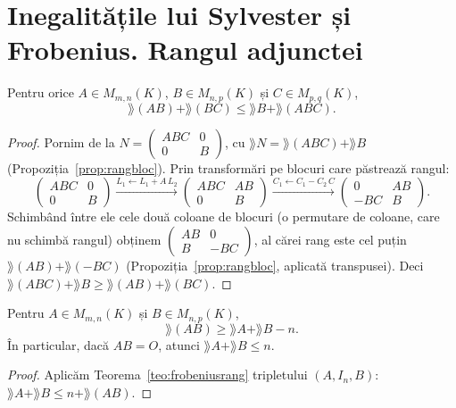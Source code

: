 \section{Inegalitățile lui Sylvester și Frobenius. Rangul adjunctei}

\begin{teorema}\label{teo:frobeniusrang}
Pentru orice $A\in M_{m,n}(K)$, $B\in M_{n,p}(K)$ și $C\in M_{p,q}(K)$,
\[
\rang(AB)+\rang(BC)\le\rang B+\rang(ABC).
\]
\end{teorema}

\begin{proof}
Pornim de la $N=\begin{pmatrix}ABC&0\\0&B\end{pmatrix}$, cu $\rang N=\rang(ABC)+\rang B$ (Propoziția~\ref{prop:rangbloc}). Prin transformări pe blocuri care păstrează rangul:
\[
\begin{pmatrix}ABC&0\\0&B\end{pmatrix}
\xrightarrow{L_1\leftarrow L_1+A\,L_2}
\begin{pmatrix}ABC&AB\\0&B\end{pmatrix}
\xrightarrow{C_1\leftarrow C_1-C_2\,C}
\begin{pmatrix}0&AB\\-BC&B\end{pmatrix}.
\]
Schimbând între ele cele două coloane de blocuri (o permutare de coloane, care nu schimbă rangul) obținem $\begin{pmatrix}AB&0\\B&-BC\end{pmatrix}$, al cărei rang este cel puțin $\rang(AB)+\rang(-BC)$ (Propoziția~\ref{prop:rangbloc}, aplicată transpusei). Deci $\rang(ABC)+\rang B\ge\rang(AB)+\rang(BC)$.
\end{proof}

\begin{corolar}\label{cor:sylvester}
Pentru $A\in M_{m,n}(K)$ și $B\in M_{n,p}(K)$,
\[
\rang(AB)\ge\rang A+\rang B-n .
\]
În particular, dacă $AB=O$, atunci $\rang A+\rang B\le n$.
\end{corolar}

\begin{proof}
Aplicăm Teorema~\ref{teo:frobeniusrang} tripletului $(A,I_n,B)$: $\rang A+\rang B\le n+\rang(AB)$.
\end{proof}

